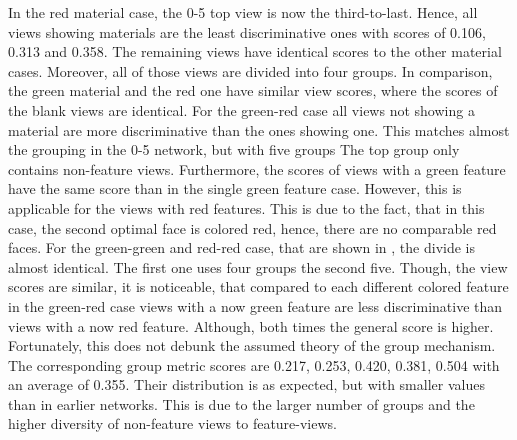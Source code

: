 In the red material case, the 0-5 top view is now the third-to-last.
Hence, all views showing materials are the least discriminative ones with scores of 0.106, 0.313 and 0.358.
The remaining views have identical scores to the other material cases.
Moreover, all of those views are divided into four groups.
In comparison, the green material and the red one have similar view scores, where the scores of the blank views are identical.
For the green-red case all views not showing a material are more discriminative than the ones showing one.
This matches almost the grouping in the 0-5 network, but with five groups
The top group only contains non-feature views.
Furthermore, the scores of views with a green feature have the same score than in the single green feature case.
However, this is applicable for the views with red features.
This is due to the fact, that in this case, the second optimal face is colored red, hence, there are no comparable red faces.
For the green-green and red-red case, that are shown in , the divide is almost identical.
The first one uses four groups the second five.
Though, the view scores are similar, it is noticeable, that compared to each different colored feature in the green-red case views with a now green feature are less discriminative than views with a now red feature.
Although, both times the general score is higher.
Fortunately, this does not debunk the assumed theory of the group mechanism.
The corresponding group metric scores are 0.217, 0.253, 0.420, 0.381, 0.504 with an average of 0.355.
Their distribution is as expected, but with smaller values than in earlier networks.
This is due to the larger number of groups and the higher diversity of non-feature views to feature-views.


